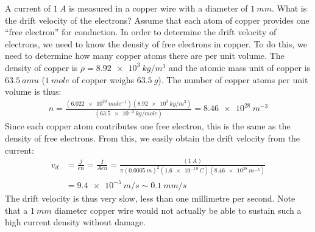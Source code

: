 \begin{example}{A current of $\SI{1}{A}$ is measured in a copper wire with a diameter of $\SI{1}{mm}$. What is the drift velocity of the electrons? Assume that each atom of copper provides one ``free electron'' for conduction.}
In order to determine the drift velocity of electrons, we need to know the density of free electrons in copper. To do this, we need to determine how many copper atoms there are per unit volume. The density of copper is $\rho=\SI{8.92e3}{kg/m^3}$ and the atomic mass unit of copper is $\SI{63.5}{amu}$ ($\SI{1}{mole}$ of copper weighs $\SI{63.5}{g}$). The number of copper atoms per unit volume is thus:
\begin{align*}
n=\frac{(\SI{6.022e23}{mole^{-1}})(\SI{8.92e3}{kg/m^3})}{(\SI{63.5e-3}{kg/mole})}=\SI{8.46e28}{m^{-3}}
\end{align*}
Since each copper atom contributes one free electron, this is the same as the density of free electrons. From this, we easily obtain the drift velocity from the current:
\begin{align*}
v_d&=\frac{j}{en}=\frac{I}{Aen}=\frac{(\SI{1}{A})}{\pi(\SI{0.0005}{m})^2(\SI{1.6e-19}{C})(\SI{8.46e28}{m^{-3}})}\\
&=\SI{9.4e-5}{m/s}\sim\SI{0.1}{mm/s}
\end{align*}
The drift velocity is thus very slow, less than one millimetre per second. Note that a $\SI{1}{mm}$ diameter copper wire would not actually be able to sustain such a high current density without damage.
\end{example}
\newpage
